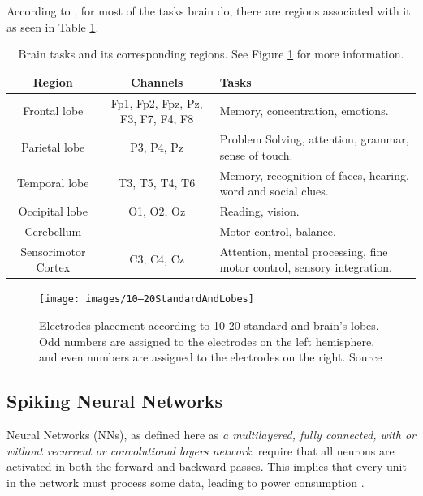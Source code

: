 		\par According to \cite{JALALYBIDGOLY2020101788}, for most of the tasks brain do, there are regions associated with it as seen in Table \ref{tb:brainRegions}.
	
		\begin{table}[H]
			\begin{center}
				\caption{Brain tasks and its corresponding regions. See Figure \ref{fig:1020standardandlobes} for more information.}
				\begin{tabular}{|c|c|p{}|}
					\hline
					Region & Channels & Tasks\\
					\hline
					Frontal lobe & Fp1, Fp2, Fpz, Pz, F3, F7, F4, F8 & Memory, concentration, emotions.\\
					\hline
					Parietal lobe& P3, P4, Pz & Problem Solving, attention, grammar, sense of touch. \\
					\hline
					Temporal lobe& T3, T5, T4, T6 & Memory, recognition of faces, hearing, word and social clues. \\
					\hline
					Occipital lobe & O1, O2, Oz & Reading, vision.\\
					\hline
					Cerebellum && Motor control, balance. \\
					\hline
					Sensorimotor Cortex & C3, C4, Cz& Attention, mental processing, ﬁne motor control, sensory integration. \\
					\hline
				\end{tabular}
				\label{tb:brainRegions}
			\end{center}
		\end{table}
	
		\begin{figure}[H]
			\centering
			\texttt{[image: images/10–20StandardAndLobes]}
			\caption[10-20 standard and brain lobes]{Electrodes placement according to 10-20 standard \cite{sistema10-20} and brain's lobes. Odd numbers are assigned to the electrodes on the left hemisphere, and even numbers are assigned to the electrodes on the right. Source \cite{JALALYBIDGOLY2020101788}}
			\label{fig:1020standardandlobes}
		\end{figure}
	
	\subsection{Spiking Neural Networks}
	
		\par Neural Networks (NNs), as defined here as \textit{a multilayered, fully connected, with or without recurrent or convolutional layers network}, require that all neurons are activated in both the forward and backward passes. This implies that every unit in the network must process some data, leading to power consumption \cite{10242251}. 

